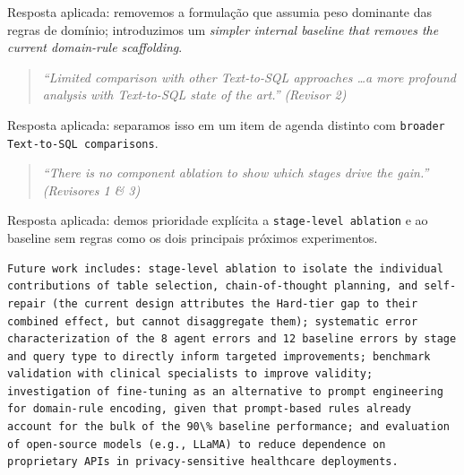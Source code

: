 \documentclass[11pt,a4paper]{article}
\begin{document}
\noindent Resposta aplicada: removemos a formulação que assumia peso dominante das regras de domínio; introduzimos um \textit{simpler internal baseline that removes the current domain-rule scaffolding}.

\begin{quote}
\textit{``Limited comparison with other Text-to-SQL approaches \ldots a more profound analysis with Text-to-SQL state of the art.''}
\hfill\textit{(Revisor 2)}
\end{quote}

\noindent Resposta aplicada: separamos isso em um item de agenda distinto com \texttt{broader Text-to-SQL comparisons}.

\begin{quote}
\textit{``There is no component ablation to show which stages drive the gain.''}
\hfill\textit{(Revisores 1 \& 3)}
\end{quote}

\noindent Resposta aplicada: demos prioridade explícita a \texttt{stage-level ablation} e ao baseline sem regras como os dois principais próximos experimentos.

\begin{originalblock}
\begin{lstlisting}[style=texsnippet]
Future work includes: stage-level ablation to isolate the individual contributions of table selection, chain-of-thought planning, and self-repair (the current design attributes the Hard-tier gap to their combined effect, but cannot disaggregate them); systematic error characterization of the 8 agent errors and 12 baseline errors by stage and query type to directly inform targeted improvements; benchmark validation with clinical specialists to improve validity; investigation of fine-tuning as an alternative to prompt engineering for domain-rule encoding, given that prompt-based rules already account for the bulk of the 90\% baseline performance; and evaluation of open-source models (e.g., LLaMA) to reduce dependence on proprietary APIs in privacy-sensitive healthcare deployments.
\end{lstlisting}
\end{originalblock}
\end{document}
